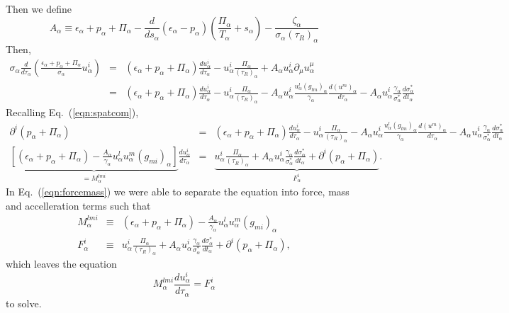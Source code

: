 \documentclass[aps,article]{revtex4}
\begin{document}
Then we define
\begin{equation}
A_{\alpha}\equiv \epsilon_{\alpha} +p_{\alpha}+\Pi_{\alpha} -\frac{d}{ds_{\alpha}}\left(\epsilon_{\alpha} -p_{\alpha}\right)\left(\frac{\Pi_{\alpha}}{T_{\alpha}}+s_{\alpha}\right) -\frac{\zeta_{\alpha}}{\sigma_{\alpha}(\tau_R)_{\alpha}}
\end{equation}
Then, 
\begin{eqnarray}
\sigma_{\alpha}\frac{d}{d\tau_{\alpha}}\left(\frac{\epsilon_{\alpha} +p_{\alpha}+\Pi_{\alpha}}{\sigma_{\alpha}}u^{i}_{\alpha}\right)
&=&\left(\epsilon_{\alpha} +p_{\alpha}+\Pi_{\alpha}\right)\frac{du^{i}_{\alpha}}{d\tau_{\alpha}}- u^i_{\alpha}    \frac{\Pi_{\alpha}}{(\tau_R)_{\alpha}}+A_{\alpha} u^i_{\alpha}\partial_{\mu}u^{\mu}_{\alpha} \nonumber\\
&=&\left(\epsilon_{\alpha} +p_{\alpha}+\Pi_{\alpha}\right)\frac{du^{i}_{\alpha}}{d\tau_{\alpha}}- u^i_{\alpha}    \frac{\Pi_{\alpha}}{(\tau_R)_{\alpha}}-A_{\alpha} u^i_{\alpha}\frac{u^l_{\alpha} (g_{lm})_{\alpha}}{\gamma_{\alpha}}\frac{d(u^m)_{\alpha}}{d\tau_{\alpha}}-A_{\alpha} u^i_{\alpha}\frac{\gamma_{\alpha}}{\sigma^*_{\alpha}}\frac{d\sigma^*_{\alpha}}{dt_{\alpha}}
\end{eqnarray}
Recalling Eq.\ (\ref{eqn:spatcom}),
\begin{eqnarray}
\partial^{i}\left(p_{\alpha}+\Pi_{\alpha}\right)
&=&\left(\epsilon_{\alpha} +p_{\alpha}+\Pi_{\alpha}\right)\frac{du^{i}_{\alpha}}{d\tau_{\alpha}}- u^i_{\alpha}    \frac{\Pi_{\alpha}}{(\tau_R)_{\alpha}}-A_{\alpha} u^i_{\alpha}\frac{u^l_{\alpha} (g_{lm})_{\alpha}}{\gamma_{\alpha}}\frac{d(u^m)_{\alpha}}{d\tau_{\alpha}}-A_{\alpha} u^i_{\alpha}\frac{\gamma_{\alpha}}{\sigma^*_{\alpha}}\frac{d\sigma^*_{\alpha}}{dt_{\alpha}}\nonumber\\
\underbrace{\left[\left(\epsilon_{\alpha} +p_{\alpha}+\Pi_{\alpha}\right)-\frac{A_{\alpha}}{\gamma_{\alpha}}u^l_{\alpha}u^m_{\alpha} (g_{mi})_{\alpha}\right]}_{=M_{\alpha}^{lmi}}\frac{du^i_{\alpha}}{d\tau_{\alpha}}&=&\underbrace{u^i_{\alpha}    \frac{\Pi_{\alpha}}{(\tau_R)_{\alpha}}+A_{\alpha} u^i_{\alpha}\frac{\gamma_{\alpha}}{\sigma^*_{\alpha}}\frac{d\sigma^*_{\alpha}}{dt_{\alpha}}+\partial^{i}\left(p_{\alpha}+\Pi_{\alpha}\right)}_{F^i_{\alpha}}\label{eqn:forcemass}.
\end{eqnarray}
In Eq.\ (\ref{eqn:forcemass}) we were able to separate the equation into force, mass and accelleration terms such that
\begin{eqnarray}
M_{\alpha}^{lmi}&\equiv&\left(\epsilon_{\alpha} +p_{\alpha}+\Pi_{\alpha}\right)-\frac{A_{\alpha}}{\gamma_{\alpha}}u^l_{\alpha}u^m_{\alpha} (g_{mi})_{\alpha}\\
F^i_{\alpha}&\equiv&u^i_{\alpha}    \frac{\Pi_{\alpha}}{(\tau_R)_{\alpha}}+A_{\alpha} u^i_{\alpha}\frac{\gamma_{\alpha}}{\sigma^*_{\alpha}}\frac{d\sigma^*_{\alpha}}{dt_{\alpha}}+\partial^{i}\left(p_{\alpha}+\Pi_{\alpha}\right),
\end{eqnarray}
which leaves the equation
\begin{equation}
M_{\alpha}^{lmi} \frac{du^i_{\alpha}}{d\tau_{\alpha}}=F^i_{\alpha}
\end{equation}
to solve.
\end{document}

